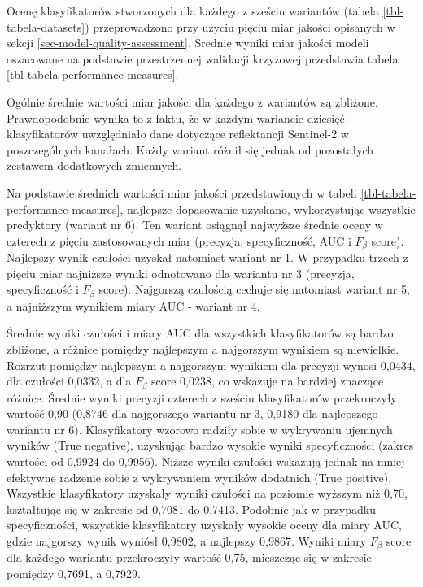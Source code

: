 \documentclass{amuthesis}
\begin{document}
Ocenę klasyfikatorów stworzonych dla każdego z sześciu wariantów (tabela
\ref{tbl-tabela-datasets}) przeprowadzono przy użyciu pięciu miar
jakości opisanych w sekcji \ref{sec-model-quality-assessment}. Średnie
wyniki miar jakości modeli oszacowane na podstawie przestrzennej
walidacji krzyżowej przedstawia tabela
\ref{tbl-tabela-performance-measures}.

Ogólnie średnie wartości miar jakości dla każdego z wariantów są
zbliżone. Prawdopodobnie wynika to z faktu, że w każdym wariancie
dziesięć klasyfikatorów uwzględniało dane dotyczące reflektancji
Sentinel-2 w poszczególnych kanałach. Każdy wariant różnił się jednak od
pozostałych zestawem dodatkowych zmiennych.

Na podstawie średnich wartości miar jakości przedstawionych w tabeli
\ref{tbl-tabela-performance-measures}, najlepsze dopasowanie uzyskano,
wykorzystując wszystkie predyktory (wariant nr 6). Ten wariant osiągnął
najwyższe średnie oceny w czterech z pięciu zastosowanych miar
(precyzja, specyficzność, AUC i \(F_{\beta}\) score). Najlepszy wynik
czułości uzyskał natomiast wariant nr 1. W przypadku trzech z pięciu
miar najniższe wyniki odnotowano dla wariantu nr 3 (precyzja,
specyficzność i \(F_{\beta}\) score). Najgorszą czułością cechuje się
natomiast wariant nr 5, a najniższym wynikiem miary AUC - wariant nr 4.

Średnie wyniki czułości i miary AUC dla wszystkich klasyfikatorów są
bardzo zbliżone, a różnice pomiędzy najlepszym a najgorszym wynikiem są
niewielkie. Rozrzut pomiędzy najlepszym a najgorszym wynikiem dla
precyzji wynosi 0,0434, dla czułości 0,0332, a dla \(F_{\beta}\) score
0,0238, co wskazuje na bardziej znaczące różnice. Średnie wyniki
precyzji czterech z sześciu klasyfikatorów przekroczyły wartość 0,90
(0,8746 dla najgorszego wariantu nr 3, 0,9180 dla najlepszego wariantu
nr 6). Klasyfikatory wzorowo radziły sobie w wykrywaniu ujemnych wyników
(True negative), uzyskując bardzo wysokie wyniki specyficzności (zakres
wartości od 0,9924 do 0,9956). Niższe wyniki czułości wskazują jednak na
mniej efektywne radzenie sobie z wykrywaniem wyników dodatnich (True
positive). Wszystkie klasyfikatory uzyskały wyniki czułości na poziomie
wyższym niż 0,70, kształtując się w zakresie od 0,7081 do 0,7413.
Podobnie jak w przypadku specyficzności, wszystkie klasyfikatory
uzyskały wysokie oceny dla miary AUC, gdzie najgorszy wynik wyniósł
0,9802, a najlepszy 0,9867. Wyniki miary \(F_{\beta}\) score dla każdego
wariantu przekroczyły wartość 0,75, mieszcząc się w zakresie pomiędzy
0,7691, a 0,7929.
\end{document}
